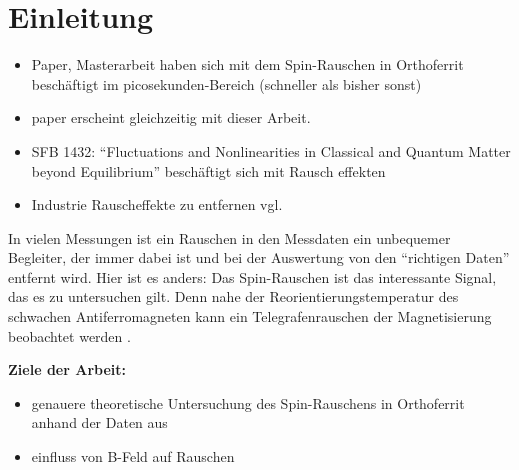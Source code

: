 \documentclass[main.tex]{subfiles}
\begin{document}
\section{Einleitung}


\begin{itemize}
    \item Paper, Masterarbeit haben sich mit dem Spin-Rauschen in Orthoferrit beschäftigt \cite{weiss-ultrafast,schlegel-master} im picosekunden-Bereich (schneller als bisher sonst)
    \item paper erscheint gleichzeitig mit dieser Arbeit.
    \item SFB 1432: \enquote{Fluctuations and Nonlinearities in Classical and Quantum Matter beyond Equilibrium} \cite{sfb-1432-b06} beschäftigt sich mit Rausch effekten 
    \item Industrie Rauscheffekte zu entfernen vgl. \cite{schlegel-bachelor, schlegel-master}
\end{itemize}

In vielen Messungen ist ein Rauschen in den Messdaten ein unbequemer Begleiter, der immer dabei ist und bei der Auswertung von den \enquote{richtigen Daten} entfernt wird. Hier ist es anders: Das Spin-Rauschen ist das interessante Signal, das es zu untersuchen gilt. Denn nahe der Reorientierungstemperatur des schwachen Antiferromagneten kann ein Telegrafenrauschen der Magnetisierung beobachtet werden \cite{weiss-ultrafast}.


\textbf{Ziele der Arbeit:}
\begin{itemize}
    \item genauere theoretische Untersuchung des Spin-Rauschens in Orthoferrit anhand der Daten aus \cite{schlegel-master}
    \item einfluss von B-Feld auf Rauschen
\end{itemize}

\end{document}
